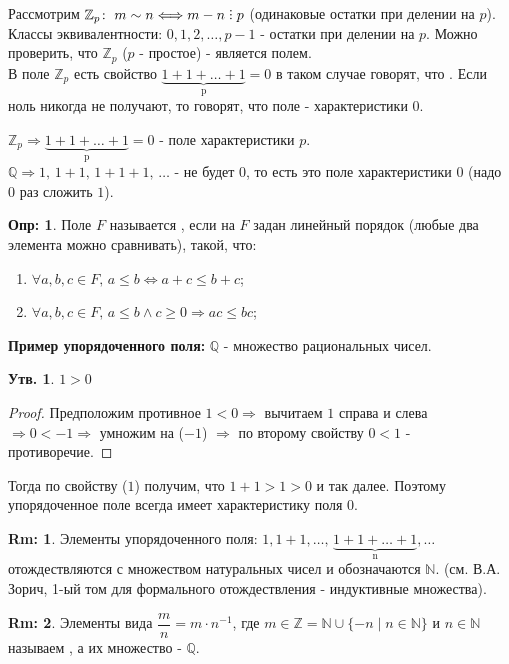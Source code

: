 \documentclass[12pt]{article}
\theoremstyle{definition}
\newtheorem{defn}{Опр:}
\newtheorem{rem}{Rm:}
\newtheorem{prop}{Утв.}
\DeclareRobustCommand{\divby}{%
	\mathrel{\text{\vbox{\baselineskip.65ex\lineskiplimit0pt\hbox{.}\hbox{.}\hbox{.}}}}%
}
\begin{document}
Рассмотрим $\mathbb{Z}_p \colon \; m \sim n \Longleftrightarrow m - n \divby p$ (одинаковые остатки при делении на $p$).\\
Классы эквивалентности: $0, 1, 2, \dotsc , p-1$ - остатки при делении на $p$. Можно проверить, что $\mathbb{Z}_p$ ($p$ - простое) - является полем.\\
В поле $\mathbb{Z}_p$ есть свойство $\underbrace{1 + 1 + \dotsc + 1}_\text{p} = 0$ в таком случае говорят, что . Если ноль никогда не получают, то говорят, что поле - характеристики $0$.

$\mathbb{Z}_p \Rightarrow \underbrace{1 + 1 + \dotsc + 1}_\text{p} = 0$ - поле характеристики $p$.\\
$\mathbb{Q} \Rightarrow 1, \, 1 + 1, \, 1 + 1 + 1, \, \dotsc$ - не будет $0$, то есть это поле характеристики $0$ (надо $0$ раз сложить $1$).
\begin{defn}
	Поле $F$ называется , если на $F$ задан линейный порядок (любые два элемента можно сравнивать), такой, что:
	\begin{enumerate}[label={\arabic*)}]
		\item $\forall a,b,c \in F, \, a \leq b \Leftrightarrow a + c \leq b + c$;
		\item $\forall a,b,c \in F, \, a \leq b \wedge c \geq 0 \Rightarrow ac \leq bc$;
	\end{enumerate}
\end{defn}

\textbf{Пример упорядоченного поля:} $\mathbb{Q}$ - множество рациональных чисел.
\begin{prop}
 $1 > 0$
\end{prop}
	\begin{proof}
		Предположим противное $1<0 \Rightarrow$ вычитаем $1$ справа и слева $\Rightarrow 0 < -1 \Rightarrow$ умножим на ($-1$) $\Rightarrow$ по второму свойству $0<1$ - противоречие.
	\end{proof}

Тогда по свойству ($1$) получим, что $1 + 1 > 1 > 0$ и так далее. Поэтому упорядоченное поле всегда имеет характеристику поля $0$.

\begin{rem}
	Элементы упорядоченного поля: $1, 1 + 1, \dotsc ,\,\underbrace{1 + 1 + \dotsc + 1}_\text{n}, \dotsc	$ отождествляются с множеством натуральных чисел и обозначаются $\mathbb{N}$. (см. В.А. Зорич, 1-ый том для формального отождествления - индуктивные множества).		
\end{rem}
\begin{rem}
	Элементы вида $\dfrac{m}{n} = m \cdot n^{-1}$, где $m \in \mathbb{Z} = \mathbb{N} \cup \{-n \; | \; n \in \mathbb{N}\}$ и $n \in \mathbb{N}$ называем , а их множество -  $\mathbb{Q}$.
\end{rem}
\end{document}
